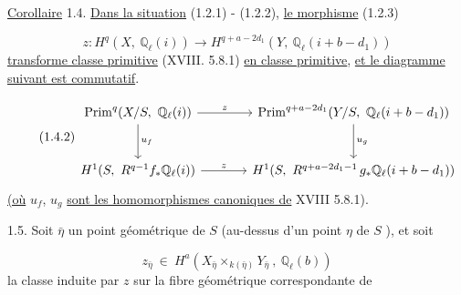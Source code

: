 \underline{Corollaire} 1.4.  \underline{Dans la situation} (1.2.1) - (1.2.2), \underline{le morphisme} (1.2.3)

\begin{equation}\tag{1.4.1}
z : H^q(X,\ \mathbb{Q}_\ell(i)) \longrightarrow H^{q+a-2d_1} (Y,\ \mathbb{Q}_\ell(i+b-d_1))
\end{equation}
\underline{transforme classe primitive} (XVIII. 5.8.1) \underline{en classe primitive}, \underline{et le diagramme suivant est commutatif}.



\begin{equation}\tag{1.4.2}
\begin{tikzcd}[column sep=large, row sep=large]
\mathrm{Prim}^{q}(X/S,\ \mathbb{Q}_\ell(i)) \arrow[r, "z"] \arrow[d, "u_f"] & \mathrm{Prim}^{q+a-2d_1}(Y/S,\ \mathbb{Q}_\ell(i+b-d_1)) \arrow[d, "u_g"] \\
H^{1}(S,\ R^{q-1}f_*\mathbb{Q}_\ell(i)) \arrow[r, "z"] & H^{1}(S,\ R^{q+a-2d_1-1}\,g_*\mathbb{Q}_\ell(i+b-d_1))
\end{tikzcd}
\end{equation}
\underline{(où} $u_f$, $u_g$ \underline{sont les homomorphismes canoniques de} XVIII 5.8.1).

1.5. Soit $\bar{\eta}$ un point géométrique de $S$ (au-dessus d'un point $\eta$ de $S$ ), et soit

\begin{equation}\tag{1.5.1}
z_{\bar{\eta}} \ \in \ H^{a}(X_{\bar{\eta}} \times_{k(\bar{\eta})} Y_{\bar{\eta}} \ , \ \mathbb{Q}_\ell(b))
\end{equation}
la classe induite par $z$ sur la fibre géométrique correspondante de

